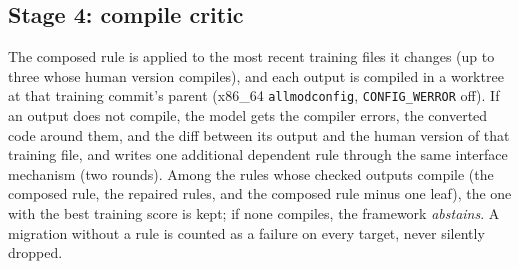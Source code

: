 \subsection{Stage 4: compile critic}
The composed rule is applied to the most recent training files it changes (up to three whose human version
compiles), and each output is compiled in a worktree at that training commit's parent (x86\_64
\texttt{allmodconfig}, \texttt{CONFIG\_WERROR} off). If an output does not compile, the model gets the compiler
errors, the converted code around them, and the diff between its output and the human version of that training
file, and writes one additional dependent rule through the same interface mechanism (two rounds). Among the rules
whose checked outputs compile (the composed rule, the repaired rules, and the composed rule minus one leaf), the
one with the best training score is kept; if none compiles, the framework \emph{abstains}. A migration without a
rule is counted as a failure on every target, never silently dropped.
